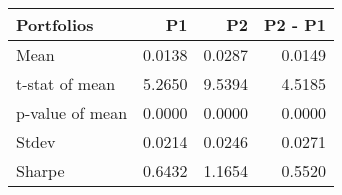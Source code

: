 \begin{tabular}{lrrr}
\toprule
Portfolios & P1 & P2 & P2 - P1 \\
\midrule
Mean & 0.0138 & 0.0287 & 0.0149 \\
t-stat of mean & 5.2650 & 9.5394 & 4.5185 \\
p-value of mean & 0.0000 & 0.0000 & 0.0000 \\
Stdev & 0.0214 & 0.0246 & 0.0271 \\
Sharpe & 0.6432 & 1.1654 & 0.5520 \\
\bottomrule
\end{tabular}

